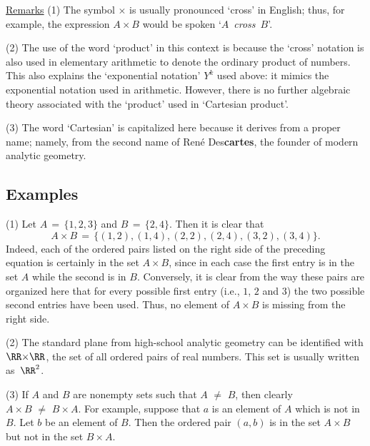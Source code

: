 \V

        \underline{Remarks} (1) The symbol ${\times}$ is usually pronounced `cross' in English; thus, for example, the expression $A{\times}B$ would be spoken `$A$~{\em cross}~$B$'.

\V

        (2) The use of the word `product' in this context is because the `cross' notation is also used in elementary arithmetic to denote the ordinary product of numbers.
    This also explains the `exponential notation' $Y^{k}$ used above: it mimics the exponential notation used in arithmetic.
    However, there is no further algebraic theory associated with the `product' used in `Cartesian product'.

\V

        (3) The word `Cartesian' is capitalized here because it derives from a proper name; namely, from the second name of Ren\'{e} Des{\bf cartes}, the founder of modern analytic geometry.

\VV

        \subsection{\small{{\bf Examples}}}
        \label{ExampA12.40}

\hspace*{\parindent}
    (1) Let $A \,=\, \{1,2,3\}$ and $B \,=\, \{2,4\}$. Then it is clear that
        \begin{displaymath}
        A{\times}B \,=\, \{(1,2), (1,4), (2,2), (2,4), (3,2), (3,4)\}.
        \end{displaymath}
    Indeed, each of the ordered pairs listed on the right side of the preceding equation is certainly in the set $A{\times}B$,
    since in each case the first entry is in the set $A$ while the second is in $B$.
    Conversely, it is clear from the way these pairs are organized here that for every possible first entry (i.e., $1$, $2$ and $3$) the two possible second entries have been used.
    Thus, no element of $A{\times}B$ is missing from the right side.

\V

        (2) The standard plane from high-school analytic geometry can be identified with ${\RR}{\times}{\RR}$, the set of all ordered pairs of real numbers. This set is usually written as~${\RR}^{2}$.

\V

        (3) If $A$ and $B$ are nonempty sets such that $A \,\,{\neq}\,\, B$, then clearly $A{\times}B \,\,{\neq}\,\, B{\times}A$.
    For example, suppose that $a$ is an element of $A$ which is not in $B$. Let $b$ be an element of $B$.
    Then the ordered pair $(a,b)$ is in the set $A{\times}B$ but not in the set $B{\times}A$.

